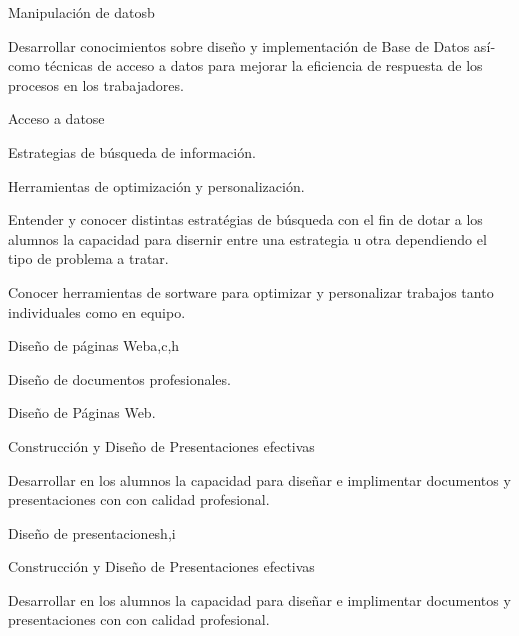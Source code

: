 \begin{syllabus}
\begin{unit}{Manipulación de datos}{}{b}
   \begin{learningoutcomes}
      \item  Desarrollar conocimientos sobre diseño y implementación de Base de Datos así­ como técnicas de acceso a datos para mejorar la eficiencia de respuesta de los procesos en los trabajadores.
   \end{learningoutcomes}
\end{unit}

\begin{unit}{Acceso a datos}{}{e}
   \begin{topics}
      \item Estrategias de búsqueda de información.
      \item Herramientas de optimización y personalización.
   \end{topics}

   \begin{learningoutcomes}
      \item Entender y conocer distintas estratégias de búsqueda con el fin de dotar a los alumnos la capacidad para disernir entre una estrategia  u otra dependiendo el tipo de problema a tratar.
      \item  Conocer herramientas de sortware para optimizar y personalizar trabajos tanto individuales como en equipo.
   \end{learningoutcomes}
\end{unit}

\begin{unit}{Diseño de páginas Web}{}{a,c,h}
   \begin{topics}
      \item Diseño de documentos profesionales.
      \item Diseño de Páginas Web.
      \item Construcción  y Diseño de Presentaciones  efectivas 
    \end{topics}
  \begin{learningoutcomes}
      \item Desarrollar en los alumnos la capacidad para diseñar  e implimentar documentos y presentaciones con 
       con calidad profesional.
  \end{learningoutcomes}
\end{unit}

\begin{unit}{Diseño de presentaciones}{}{h,i}
   \begin{topics}
      \item Construcción  y Diseño de Presentaciones  efectivas 
    \end{topics}
  \begin{learningoutcomes}
      \item Desarrollar en los alumnos la capacidad para diseñar  e implimentar documentos y presentaciones con 
       con calidad profesional.
  \end{learningoutcomes}
\end{unit}


\end{syllabus}
